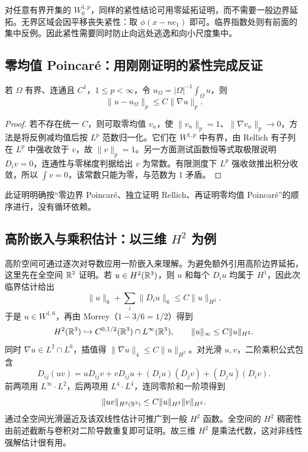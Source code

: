 对任意有界开集的 $W^{1,p}_0$，同样的紧性结论可用零延拓证明，而不需要一般边界延拓。无界区域会因平移丧失紧性：取 $\phi(x-ne_1)$ 即可。临界指数处则有前面的集中反例。因此紧性需要同时防止向远处逃逸和向小尺度集中。

\subsection{零均值 Poincar\'e：用刚刚证明的紧性完成反证}

\begin{theorem}\label{thm:sobolev-mean-poincare}
若 $\Omega$ 有界、连通且 $C^1$，$1\le p<\infty$，令 $u_\Omega=|\Omega|^{-1}\int_\Omega u$，则
\[
 \|u-u_\Omega\|_p\le C\|\nabla u\|_p.
\]
\end{theorem}
\begin{proof}
若不存在统一 $C$，则可取零均值 $v_n$，使 $\|v_n\|_p=1$、$\|\nabla v_n\|_p\to0$，方法是将反例减均值后按 $L^p$ 范数归一化。它们在 $W^{1,p}$ 中有界，由 Rellich 有子列在 $L^p$ 中强收敛于 $v$，故 $\|v\|_p=1$。另一方面测试函数恒等式取极限说明 $D_i v=0$，连通性与零梯度判据给出 $v$ 为常数。有限测度下 $L^p$ 强收敛推出积分收敛，所以 $\int v=0$，该常数只能为零，与范数为 1 矛盾。
\end{proof}
此证明明确按“零边界 Poincar\'e、独立证明 Rellich、再证明零均值 Poincar\'e”的顺序进行，没有循环依赖。

\subsection{高阶嵌入与乘积估计：以三维 \texorpdfstring{$H^2$}{H2} 为例}

高阶空间可通过逐次对导数应用一阶嵌入来理解。为避免额外引用高阶边界延拓，这里先在全空间 $\mathbb R^3$ 证明。若 $u\in H^2(\mathbb R^3)$，则 $u$ 和每个 $D_i u$ 均属于 $H^1$，因此次临界估计给出
\[
 \|u\|_6+\sum_i\|D_i u\|_6\le C\|u\|_{H^2}.
\]
于是 $u\in W^{1,6}$，再由 Morrey（$1-3/6=1/2$）得到
\begin{equation}
 H^2(\mathbb R^3)\hookrightarrow C^{0,1/2}(\mathbb R^3)\cap L^\infty(\mathbb R^3),
 \qquad\|u\|_\infty\le C\|u\|_{H^2}.
 \label{eq:sobolev-h2-embedding}
\end{equation}
同时 $\nabla u\in L^2\cap L^6$，插值得 $\|\nabla u\|_4\le C\|u\|_{H^2}$。对光滑 $u,v$，二阶乘积公式包含
\[
 D_{ij}(uv)=uD_{ij}v+vD_{ij}u+(D_i u)(D_j v)+(D_j u)(D_i v).
\]
前两项用 $L^\infty\cdot L^2$，后两项用 $L^4\cdot L^4$，连同零阶和一阶项得到
\begin{equation}
 \|uv\|_{H^2(\mathbb R^3)}\le C\|u\|_{H^2}\|v\|_{H^2}.
 \label{eq:sobolev-h2-algebra}
\end{equation}
通过全空间光滑逼近及该双线性估计可推广到一般 $H^2$ 函数。全空间的 $H^2$ 稠密性由前述截断与卷积对二阶导数重复即可证明。故三维 $H^2$ 是乘法代数，这对非线性强解估计很有用。


